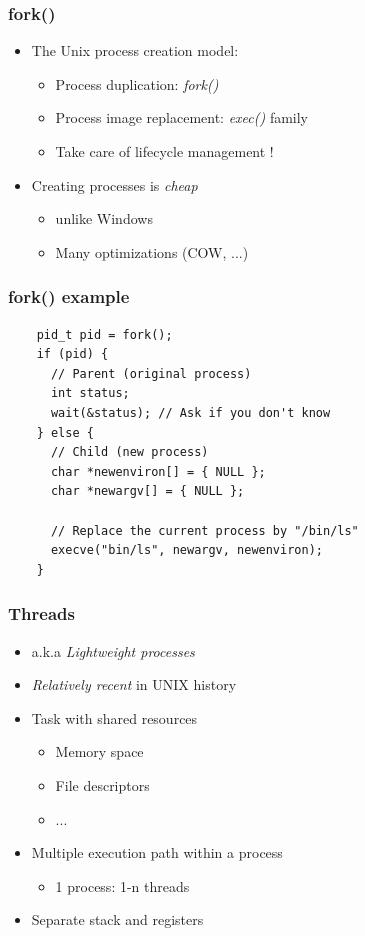 \begin{frame}
  \frametitle{fork()}

  \begin{itemize}
  \item The Unix process creation model:
    \begin{itemize}
    \item Process duplication: \emph{fork()}
    \item Process image replacement: \emph{exec()} family
    \item Take care of lifecycle management !
    \end{itemize}
  \item Creating processes is \emph{cheap}
    \begin{itemize}
    \item unlike Windows
    \item Many optimizations (COW, ...)
    \end{itemize}
  \end{itemize}
\end{frame}


\begin{frame}[fragile]
  \frametitle{fork() example}

  \begin{verbatim}
    pid_t pid = fork();
    if (pid) {
      // Parent (original process)
      int status;
      wait(&status); // Ask if you don't know
    } else {
      // Child (new process)
      char *newenviron[] = { NULL };
      char *newargv[] = { NULL };

      // Replace the current process by "/bin/ls"
      execve("bin/ls", newargv, newenviron);
    }
  \end{verbatim}
\end{frame}



\begin{frame}
  \frametitle{Threads}

  \begin{itemize}
  \item a.k.a \emph{Lightweight processes}
  \item \emph{Relatively recent} in UNIX history
  \item Task with shared resources
    \begin{itemize}
    \item Memory space
    \item File descriptors
    \item ...
    \end{itemize}
  \item Multiple execution path within a process
    \begin{itemize}
    \item 1 process: 1-n threads
    \end{itemize}
  \item Separate stack and registers
  \end{itemize}
\end{frame}


